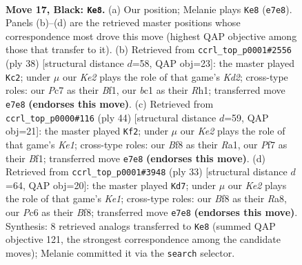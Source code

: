 \documentclass[11pt]{article}
\begin{document}
\clearpage

\begin{figure}[p]\centering
\begin{subfigure}{0.46\textwidth}\centering
\resizebox{\linewidth}{!}{%
\newchessgame
\chessboard[
  setfen={r1b2b1r/p1p1kp1p/2p3p1/8/PPP2P1P/8/6R1/RNB1K3 b Q - 0 17},
  showmover=false,
  pgfstyle=straightmove, color=movearrow, markmove={e7-e8}
]}
\caption{}
\end{subfigure}\hfill
\begin{subfigure}{0.46\textwidth}\centering
\resizebox{\linewidth}{!}{%
\newchessgame
\chessboard[
  setfen={3k3r/pb3ppp/1p6/4p3/2P5/4BP1P/nP1K2P1/5B1R w - - 2 20},
  showmover=false,
  pgfstyle=straightmove, color=movearrow, markmove={d2-c2}
]}
\caption{}
\end{subfigure}
\\[4pt]
\begin{subfigure}{0.46\textwidth}\centering
\resizebox{\linewidth}{!}{%
\newchessgame
\chessboard[
  setfen={2b1k3/5p2/1rpb1p1p/p6P/3P4/1P2P2P/P7/R3KBN1 w Q - 0 23},
  showmover=false,
  pgfstyle=straightmove, color=movearrow, markmove={e1-f2}
]}
\caption{}
\end{subfigure}\hfill
\begin{subfigure}{0.46\textwidth}\centering
\resizebox{\linewidth}{!}{%
\newchessgame
\chessboard[
  setfen={r3kb2/p1p2p1p/1p3P2/3p4/8/2P5/P1P2PPP/1RB2K2 b q - 0 17},
  showmover=false,
  pgfstyle=straightmove, color=movearrow, markmove={e8-d7}
]}
\caption{}
\end{subfigure}
\caption{\textbf{Move 17, Black: \texttt{Ke8}.} (a) Our position; Melanie plays \texttt{Ke8} (\texttt{e7e8}). Panels (b)--(d) are the retrieved master positions whose correspondence most drove this move (highest QAP objective among those that transfer to it). (b) Retrieved from \texttt{ccrl\_top\_p0001\#2556} (ply 38) [structural distance $d$=58, QAP obj=23]: the master played \texttt{Kc2}; under $\mu$ our \emph{Ke2} plays the role of that game's \emph{Kd2}; cross-type roles: our \emph{P}c7 as their \emph{B}f1, our \emph{b}c1 as their \emph{R}h1; transferred move \texttt{e7e8} \textbf{(endorses this move)}. (c) Retrieved from \texttt{ccrl\_top\_p0000\#116} (ply 44) [structural distance $d$=59, QAP obj=21]: the master played \texttt{Kf2}; under $\mu$ our \emph{Ke2} plays the role of that game's \emph{Ke1}; cross-type roles: our \emph{B}f8 as their \emph{R}a1, our \emph{P}f7 as their \emph{B}f1; transferred move \texttt{e7e8} \textbf{(endorses this move)}. (d) Retrieved from \texttt{ccrl\_top\_p0001\#3948} (ply 33) [structural distance $d$=64, QAP obj=20]: the master played \texttt{Kd7}; under $\mu$ our \emph{Ke2} plays the role of that game's \emph{Ke1}; cross-type roles: our \emph{B}f8 as their \emph{R}a8, our \emph{P}c6 as their \emph{B}f8; transferred move \texttt{e7e8} \textbf{(endorses this move)}. Synthesis: 8 retrieved analogs transferred to \texttt{Ke8} (summed QAP objective 121, the strongest correspondence among the candidate moves); Melanie committed it via the \texttt{search} selector.}
\label{fig:thought-m33}
\end{figure}
\end{document}
